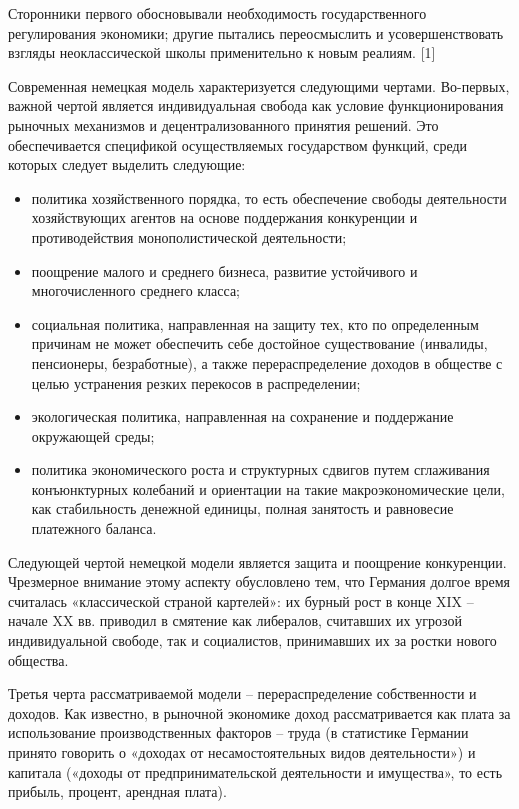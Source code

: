 \documentclass[14pt,a4paper]{article}
\begin{document}
    Сторонники первого обосновывали необходимость государственного регулирования экономики; другие пытались переосмыслить и усовершенствовать взгляды неоклассической школы применительно к новым реалиям. [1]
    \par
    Современная немецкая модель характеризуется следующими чертами.
    Во-первых, важной чертой является индивидуальная свобода как условие функционирования рыночных механизмов и децентрализованного принятия решений.
    Это обеспечивается спецификой осуществляемых государством функций, среди которых следует выделить следующие:
    \begin{itemize}
        \item политика хозяйственного порядка, то есть обеспечение свободы деятельности хозяйствующих агентов на основе поддержания конкуренции и противодействия монополистической деятельности;
        \item поощрение малого и среднего бизнеса, развитие устойчивого и многочисленного среднего класса;
        \item социальная политика, направленная на защиту тех, кто по определенным причинам не может обеспечить себе достойное существование (инвалиды, пенсионеры, безработные), а также перераспределение доходов в обществе с целью устранения резких перекосов в распределении;
        \item экологическая политика, направленная на сохранение и поддержание окружающей среды;
        \item политика экономического роста и структурных сдвигов путем сглаживания конъюнктурных колебаний и ориентации на такие макроэкономические цели, как стабильность денежной единицы, полная занятость и равновесие платежного баланса.
    \end{itemize}
    \par
    Следующей чертой немецкой модели является защита и поощрение конкуренции.
    Чрезмерное внимание этому аспекту обусловлено тем, что Германия долгое время считалась «классической страной картелей»: их бурный рост в конце XIX – начале XX вв. приводил в смятение как либералов, считавших их угрозой индивидуальной свободе, так и социалистов, принимавших их за ростки нового общества.
    \par
    Третья черта рассматриваемой модели – перераспределение собственности и доходов.
    Как известно, в рыночной экономике доход рассматривается как плата за использование производственных факторов – труда (в статистике Германии принято говорить о «доходах от несамостоятельных видов деятельности») и капитала («доходы от предпринимательской деятельности и имущества», то есть прибыль, процент, арендная плата).
\end{document}
